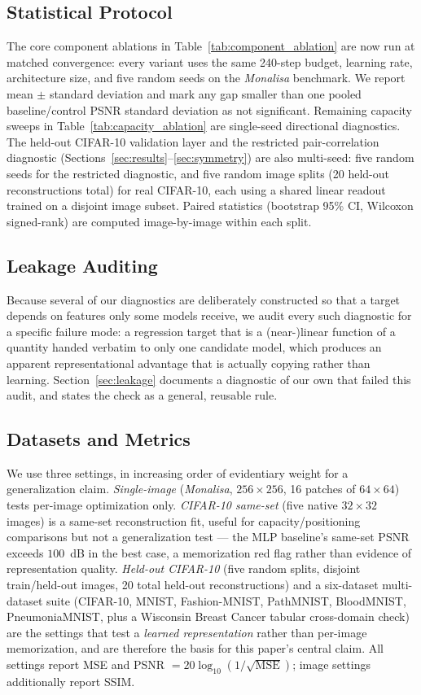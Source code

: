 \documentclass[journal]{IEEEtran}
\begin{document}
\subsection{Statistical Protocol}
The core component ablations in Table~\ref{tab:component_ablation} are now run at matched convergence: every variant uses the same 240-step budget, learning rate, architecture size, and five random seeds on the \textit{Monalisa} benchmark. We report mean $\pm$ standard deviation and mark any gap smaller than one pooled baseline/control PSNR standard deviation as not significant. Remaining capacity sweeps in Table~\ref{tab:capacity_ablation} are single-seed directional diagnostics. The held-out CIFAR-10 validation layer and the restricted pair-correlation diagnostic (Sections~\ref{sec:results}--\ref{sec:symmetry}) are also multi-seed: five random seeds for the restricted diagnostic, and five random image splits (20 held-out reconstructions total) for real CIFAR-10, each using a shared linear readout trained on a disjoint image subset. Paired statistics (bootstrap 95\% CI, Wilcoxon signed-rank) are computed image-by-image within each split.

\subsection{Leakage Auditing}
Because several of our diagnostics are deliberately constructed so that a target depends on features only some models receive, we audit every such diagnostic for a specific failure mode: a regression target that is a (near-)linear function of a quantity handed verbatim to only one candidate model, which produces an apparent representational advantage that is actually copying rather than learning. Section~\ref{sec:leakage} documents a diagnostic of our own that failed this audit, and states the check as a general, reusable rule.

\subsection{Datasets and Metrics}
We use three settings, in increasing order of evidentiary weight for a generalization claim. \textit{Single-image} (\textit{Monalisa}, $256\times256$, 16 patches of $64\times64$) tests per-image optimization only. \textit{CIFAR-10 same-set} (five native $32\times32$ images) is a same-set reconstruction fit, useful for capacity/positioning comparisons but not a generalization test --- the MLP baseline's same-set PSNR exceeds $100$~dB in the best case, a memorization red flag rather than evidence of representation quality. \textit{Held-out CIFAR-10} (five random splits, disjoint train/held-out images, 20 total held-out reconstructions) and a six-dataset multi-dataset suite (CIFAR-10, MNIST, Fashion-MNIST, PathMNIST, BloodMNIST, PneumoniaMNIST, plus a Wisconsin Breast Cancer tabular cross-domain check) are the settings that test a \emph{learned representation} rather than per-image memorization, and are therefore the basis for this paper's central claim. All settings report MSE and PSNR $=20\log_{10}(1/\sqrt{\mathrm{MSE}})$; image settings additionally report SSIM.
\end{document}
